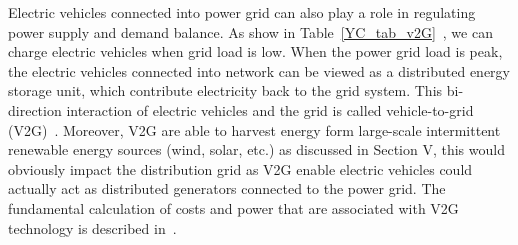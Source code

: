 Electric vehicles connected into power grid can also play a role in regulating power supply and demand balance. 
As show in Table~\ref{YC_tab_v2G}~\cite{YC_Green,YC_Acha}, we can charge electric vehicles when grid load is low. 
When the power grid load is peak, the electric vehicles connected into network can be viewed as a distributed energy storage unit, which contribute electricity back to the grid system. 
This bi-direction interaction of electric vehicles and the grid is called vehicle-to-grid (V2G)~\cite{YC_V2Gconcept1,YC_V2Gconcept2}.
Moreover, V2G are able to harvest energy form large-scale intermittent renewable energy sources (wind, solar, etc.) as discussed in Section V, this would obviously impact the distribution grid as V2G enable electric vehicles could actually act as distributed generators connected to the power grid.
The fundamental calculation of costs and power that are associated with V2G technology is described in~\cite{YC_V2Gconcept1}. 
